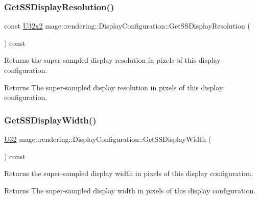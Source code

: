 \subsubsection{\texorpdfstring{Get\+S\+S\+Display\+Resolution()}{GetSSDisplayResolution()}}
{\footnotesize\ttfamily const \hyperlink{namespacemage_a88e05bff0300120c013285d3dcad95c5}{U32x2} mage\+::rendering\+::\+Display\+Configuration\+::\+Get\+S\+S\+Display\+Resolution (\begin{DoxyParamCaption}{ }\end{DoxyParamCaption}) const\hspace{0.3cm}{\ttfamily [noexcept]}}

Returns the super-\/sampled display resolution in pixels of this display configuration.

\begin{DoxyReturn}{Returns}
The super-\/sampled display resolution in pixels of this display configuration. 
\end{DoxyReturn}
\hypertarget{classmage_1_1rendering_1_1_display_configuration_aac42c90d563c8ee7a2ae795c2750dc35}{}\label{classmage_1_1rendering_1_1_display_configuration_aac42c90d563c8ee7a2ae795c2750dc35} 
\subsubsection{\texorpdfstring{Get\+S\+S\+Display\+Width()}{GetSSDisplayWidth()}}
{\footnotesize\ttfamily \hyperlink{namespacemage_a41c104c036fba3756a74e19f793eeaa1}{U32} mage\+::rendering\+::\+Display\+Configuration\+::\+Get\+S\+S\+Display\+Width (\begin{DoxyParamCaption}{ }\end{DoxyParamCaption}) const\hspace{0.3cm}{\ttfamily [noexcept]}}

Returns the super-\/sampled display width in pixels of this display configuration.

\begin{DoxyReturn}{Returns}
The super-\/sampled display width in pixels of this display configuration. 
\end{DoxyReturn}
\hypertarget{classmage_1_1rendering_1_1_display_configuration_a507e755923af2ba1338cc041b5df8e0a}{}\label{classmage_1_1rendering_1_1_display_configuration_a507e755923af2ba1338cc041b5df8e0a} 
